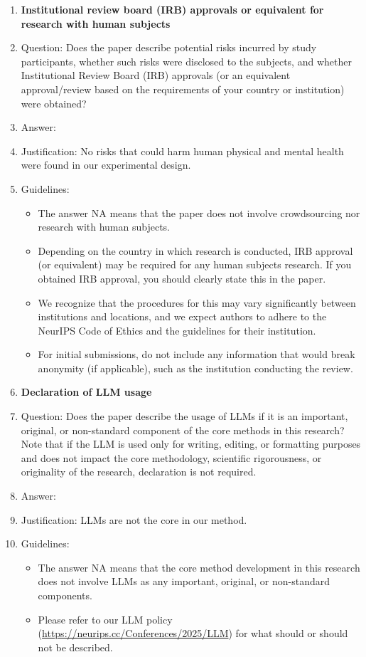 \documentclass{article}
\begin{document}
\begin{enumerate}
\item {\bf Institutional review board (IRB) approvals or equivalent for research with human subjects}
    \item[] Question: Does the paper describe potential risks incurred by study participants, whether such risks were disclosed to the subjects, and whether Institutional Review Board (IRB) approvals (or an equivalent approval/review based on the requirements of your country or institution) were obtained?
    \item[] Answer: \answerNo{} %
    \item[] Justification: No risks that could harm human physical and mental health were found in our experimental design.
    \item[] Guidelines:
    \begin{itemize}
        \item The answer NA means that the paper does not involve crowdsourcing nor research with human subjects.
        \item Depending on the country in which research is conducted, IRB approval (or equivalent) may be required for any human subjects research. If you obtained IRB approval, you should clearly state this in the paper. 
        \item We recognize that the procedures for this may vary significantly between institutions and locations, and we expect authors to adhere to the NeurIPS Code of Ethics and the guidelines for their institution. 
        \item For initial submissions, do not include any information that would break anonymity (if applicable), such as the institution conducting the review.
    \end{itemize}

\item {\bf Declaration of LLM usage}
    \item[] Question: Does the paper describe the usage of LLMs if it is an important, original, or non-standard component of the core methods in this research? Note that if the LLM is used only for writing, editing, or formatting purposes and does not impact the core methodology, scientific rigorousness, or originality of the research, declaration is not required.
    \item[] Answer: \answerNA{} %
    \item[] Justification: LLMs are not the core in our method.
    \item[] Guidelines:
    \begin{itemize}
        \item The answer NA means that the core method development in this research does not involve LLMs as any important, original, or non-standard components.
        \item Please refer to our LLM policy (\url{https://neurips.cc/Conferences/2025/LLM}) for what should or should not be described.
    \end{itemize}

\end{enumerate}
\end{document}
